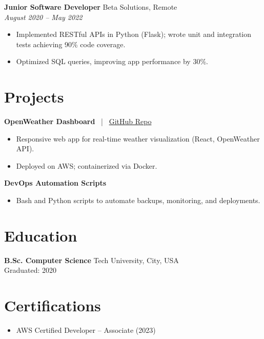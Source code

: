 \documentclass[11pt,a4paper]{article}
\begin{document}
\textbf{Junior Software Developer} \hfill Beta Solutions, Remote \\
\textit{August 2020 -- May 2022}
\vspace{-6pt}
\begin{itemize}[leftmargin=*,noitemsep]
    \item Implemented RESTful APIs in Python (Flask); wrote unit and integration tests achieving 90\% code coverage.
    \item Optimized SQL queries, improving app performance by 30\%.
\end{itemize}

\section*{Projects}
\textbf{OpenWeather Dashboard}
~|~
\href{https://github.com/johndoe/openweather-dashboard}{GitHub Repo}
\begin{itemize}[leftmargin=*,noitemsep]
    \item Responsive web app for real-time weather visualization (React, OpenWeather API).
    \item Deployed on AWS; containerized via Docker.
\end{itemize}

\textbf{DevOps Automation Scripts}
\begin{itemize}[leftmargin=*,noitemsep]
    \item Bash and Python scripts to automate backups, monitoring, and deployments.
\end{itemize}

\section*{Education}
\textbf{B.Sc. Computer Science} \hfill Tech University, City, USA \\
Graduated: 2020

\section*{Certifications}
\begin{itemize}[leftmargin=*,noitemsep]
    \item AWS Certified Developer – Associate (2023)
\end{itemize}
\end{document}
